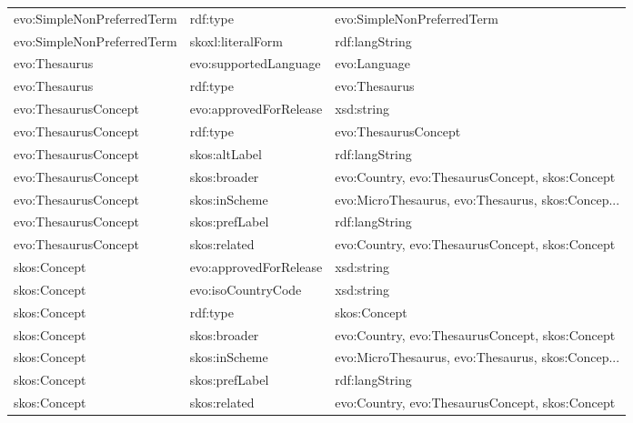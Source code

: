 \documentclass[10pt,a4paper,titlepage,final]{article}
\begin{document}
\begin{tabularx}{\textwidth}{llX}
 evo:SimpleNonPreferredTerm &                rdf:type &                         evo:SimpleNonPreferredTerm \\
 evo:SimpleNonPreferredTerm &       skoxl:literalForm &                                     rdf:langString \\
              evo:Thesaurus &   evo:supportedLanguage &                                       evo:Language \\
              evo:Thesaurus &                rdf:type &                                      evo:Thesaurus \\
       evo:ThesaurusConcept &  evo:approvedForRelease &                                         xsd:string \\
       evo:ThesaurusConcept &                rdf:type &                               evo:ThesaurusConcept \\
       evo:ThesaurusConcept &           skos:altLabel &                                     rdf:langString \\
       evo:ThesaurusConcept &            skos:broader &    evo:Country, evo:ThesaurusConcept, skos:Concept \\
       evo:ThesaurusConcept &           skos:inScheme &  evo:MicroThesaurus, evo:Thesaurus, skos:Concep... \\
       evo:ThesaurusConcept &          skos:prefLabel &                                     rdf:langString \\
       evo:ThesaurusConcept &            skos:related &    evo:Country, evo:ThesaurusConcept, skos:Concept \\
               skos:Concept &  evo:approvedForRelease &                                         xsd:string \\
               skos:Concept &      evo:isoCountryCode &                                         xsd:string \\
               skos:Concept &                rdf:type &                                       skos:Concept \\
               skos:Concept &            skos:broader &    evo:Country, evo:ThesaurusConcept, skos:Concept \\
               skos:Concept &           skos:inScheme &  evo:MicroThesaurus, evo:Thesaurus, skos:Concep... \\
               skos:Concept &          skos:prefLabel &                                     rdf:langString \\
               skos:Concept &            skos:related &    evo:Country, evo:ThesaurusConcept, skos:Concept \\

\end{tabularx}
\end{document}
